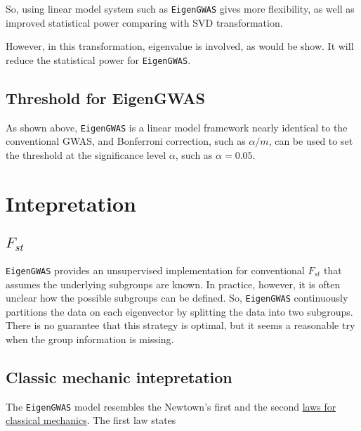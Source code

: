 \documentclass[]{book}
\begin{document}
So, using linear model system such as \texttt{EigenGWAS} gives more
flexibility, as well as improved statistical power comparing with SVD
transformation.

However, in this transformation, eigenvalue is involved, as would be
show. It will reduce the statistical power for \texttt{EigenGWAS}.

\hypertarget{threshold-for-eigengwas}{%
\subsection{Threshold for EigenGWAS}\label{threshold-for-eigengwas}}

As shown above, \texttt{EigenGWAS} is a linear model framework nearly
identical to the conventional GWAS, and Bonferroni correction, such as
\(\alpha/m\), can be used to set the threshold at the significance level
\(\alpha\), such as \(\alpha=0.05\).

\hypertarget{intepretation}{%
\section{Intepretation}\label{intepretation}}

\hypertarget{f_st}{%
\subsection{\texorpdfstring{\(F_{st}\)}{F\_\{st\}}}\label{f_st}}

\texttt{EigenGWAS} provides an unsupervised implementation for
conventional \(F_{st}\) that assumes the underlying subgroups are known.
In practice, however, it is often unclear how the possible subgroups can
be defined. So, \texttt{EigenGWAS} continuously partitions the data on
each eigenvector by splitting the data into two subgroups. There is no
guarantee that this strategy is optimal, but it seems a reasonable try
when the group information is missing.

\hypertarget{classic-mechanic-intepretation}{%
\subsection{Classic mechanic
intepretation}\label{classic-mechanic-intepretation}}

The \texttt{EigenGWAS} model resembles the Newtown's first and the
second
\href{https://en.wikipedia.org/wiki/Newton\%27s_laws_of_motion}{laws for
classical mechanics}. The first law states
\end{document}

